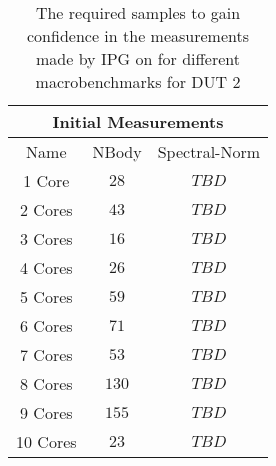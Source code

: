 \begin{table}[H]
    \centering
    \begin{tabular}{|| c | c | c ||}
    \hline
    \multicolumn{3}{||c||}{Initial Measurements} \\ [0.5ex] \hline\hline
    Name & NBody & Spectral-Norm \\\hline
    1 Core& $28$ & $TBD$ \\
    2 Cores& $43$ & $TBD$ \\
    3 Cores& $16$ & $TBD$ \\
    4 Cores& $26$ & $TBD$ \\
    5 Cores& $59$ & $TBD$ \\
    6 Cores& $71$ & $TBD$ \\
    7 Cores& $53$ & $TBD$ \\
    8 Cores& $130$ & $TBD$ \\
    9 Cores& $155$ & $TBD$ \\
    10 Cores& $23$ & $TBD$ \\\hline
    \end{tabular}
    \caption{The required samples to gain confidence in the measurements made by IPG on for different macrobenchmarks for DUT 2}
    \label{tab:initial-measurements-exp-3-dut-2-app}
\end{table}